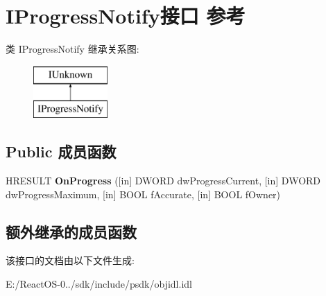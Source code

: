 \hypertarget{interface_i_progress_notify}{}\section{I\+Progress\+Notify接口 参考}
\label{interface_i_progress_notify}
类 I\+Progress\+Notify 继承关系图\+:\begin{figure}[H]
\begin{center}
\leavevmode
\includegraphics[height=2.000000cm]{interface_i_progress_notify}
\end{center}
\end{figure}
\subsection*{Public 成员函数}
\begin{DoxyCompactItemize}
\item 
\mbox{\label{interface_i_progress_notify_ae43b97c1f39a52f998913baee1903bdd}} 
H\+R\+E\+S\+U\+LT {\bfseries On\+Progress} (\mbox{[}in\mbox{]} D\+W\+O\+RD dw\+Progress\+Current, \mbox{[}in\mbox{]} D\+W\+O\+RD dw\+Progress\+Maximum, \mbox{[}in\mbox{]} B\+O\+OL f\+Accurate, \mbox{[}in\mbox{]} B\+O\+OL f\+Owner)
\end{DoxyCompactItemize}
\subsection*{额外继承的成员函数}


该接口的文档由以下文件生成\+:\begin{DoxyCompactItemize}
\item 
E\+:/\+React\+O\+S-\/0../sdk/include/psdk/objidl.\+idl\end{DoxyCompactItemize}
